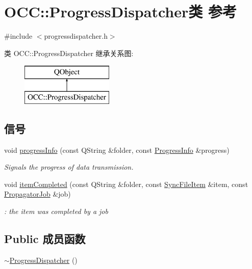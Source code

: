 \hypertarget{class_o_c_c_1_1_progress_dispatcher}{}\section{O\+CC\+:\+:Progress\+Dispatcher类 参考}
\label{class_o_c_c_1_1_progress_dispatcher}


{\ttfamily \#include $<$progressdispatcher.\+h$>$}

类 O\+CC\+:\+:Progress\+Dispatcher 继承关系图\+:\begin{figure}[H]
\begin{center}
\leavevmode
\includegraphics[height=2.000000cm]{class_o_c_c_1_1_progress_dispatcher}
\end{center}
\end{figure}
\subsection*{信号}
\begin{DoxyCompactItemize}
\item 
void \hyperlink{class_o_c_c_1_1_progress_dispatcher_a1ac2bda280b4f931fc4549ec6c5443ab}{progress\+Info} (const Q\+String \&folder, const \hyperlink{class_o_c_c_1_1_progress_info}{Progress\+Info} \&progress)
\begin{DoxyCompactList}\small\item\em Signals the progress of data transmission. \end{DoxyCompactList}\item 
void \hyperlink{class_o_c_c_1_1_progress_dispatcher_a4be47980c06beb15d8486d0b1214859b}{item\+Completed} (const Q\+String \&folder, const \hyperlink{class_o_c_c_1_1_sync_file_item}{Sync\+File\+Item} \&item, const \hyperlink{class_o_c_c_1_1_propagator_job}{Propagator\+Job} \&job)
\begin{DoxyCompactList}\small\item\em \+: the item was completed by a job \end{DoxyCompactList}\end{DoxyCompactItemize}
\subsection*{Public 成员函数}
\begin{DoxyCompactItemize}
\item 
\hyperlink{class_o_c_c_1_1_progress_dispatcher_a6c35947d6acd2f6a5d1c1f46a187c454}{$\sim$\+Progress\+Dispatcher} ()
\end{DoxyCompactItemize}
